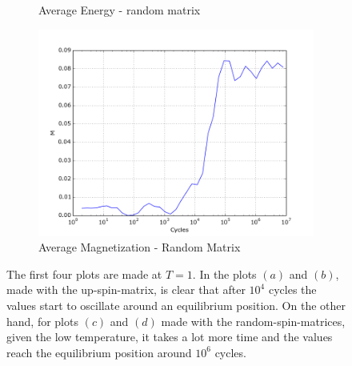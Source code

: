 \documentclass[10pt,a4paper,titlepage]{article}
\begin{document}
\begin{figure}[H]
\begin{subfigure}{.5\textwidth}
  \caption{{\footnotesize Average Energy - random matrix}}
  \label{fig:sfig2}
\end{subfigure}
\begin{subfigure}{.5\textwidth}
  \centering
  \includegraphics[width=.8\linewidth]{MAGNETIZATION_T1_RAND_1000MEAN}
  \caption{{\footnotesize Average Magnetization - Random Matrix}}
  \label{fig:sfig2}
\end{subfigure}
\caption{{\footnotesize The first four plots are made at $T=1$. In the plots $(a)$ and $(b)$, made with the up-spin-matrix, is clear that after $10^4$ cycles the values start to oscillate around an equilibrium position. On the other hand, for plots  $(c)$ and $(d)$ made with the random-spin-matrices, given the low temperature, it takes a lot more time and the values reach the equilibrium position around $10^6$ cycles.}}
\label{fig:fig}
\end{figure}
\end{document}
